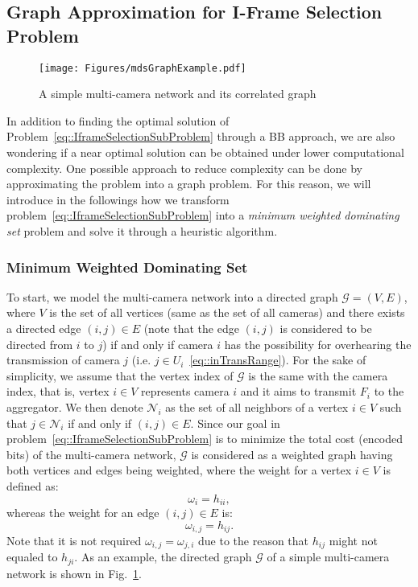 \subsection{Graph Approximation for I-Frame Selection Problem}
\label{sec::graphApprox}
%
\begin{figure}
\begin{center}
\texttt{[image: Figures/mdsGraphExample.pdf]}
\caption{\label{fig::mdsGraphExample}A simple multi-camera network and its correlated graph}
\end{center}
\end{figure}
%
In addition to finding the optimal solution of Problem~\eqref{eq::IframeSelectionSubProblem} through a BB approach, we are also wondering if a near optimal solution can be obtained under lower computational complexity.
One possible approach to reduce complexity can be done by approximating the problem into a graph problem.
For this reason, we will introduce in the followings how we transform problem~\eqref{eq::IframeSelectionSubProblem} into a \emph{minimum weighted dominating set} problem and solve it through a heuristic algorithm.
%
\subsubsection{Minimum Weighted Dominating Set}
To start, we model the multi-camera network into a directed graph $\mathcal{G}=(V,E)$, where $V$ is the set of all vertices (same as the set of all cameras) and there exists a directed edge $(i,j) \in E$ (note that the edge $(i,j)$ is considered to be directed from $i$ to $j$) if and only if camera $i$ has the possibility for overhearing the transmission of camera $j$ (i.e. $j \in U_i$~\eqref{eq::inTransRange}).
For the sake of simplicity, we assume that the vertex index of $\mathcal{G}$ is the same with the camera index, that is, vertex $i \in V$ represents camera $i$ and it aims to transmit $F_i$ to the aggregator.
We then denote $\mathcal{N}_i$ as the set of all neighbors of a vertex $i \in V$ such that $j \in \mathcal{N}_i$ if and only if $(i,j) \in E$.
Since our goal in problem~\eqref{eq::IframeSelectionSubProblem} is to minimize the total cost (encoded bits) of the multi-camera network, $\mathcal{G}$ is considered as a weighted graph having both vertices and edges being weighted, where the weight for a vertex $i \in V$ is defined as:
\begin{equation}
\omega_i = h_{ii},
\end{equation}
whereas the weight for an edge $(i,j) \in E$ is:
\begin{equation}
\omega_{i,j} = h_{ij}.
\end{equation}
Note that it is not required $\omega_{i,j} = \omega_{j,i}$ due to the reason that $h_{ij}$ might not equaled to $h_{ji}$.
As an example, the directed graph $\mathcal{G}$ of a simple multi-camera network is shown in Fig.~\ref{fig::mdsGraphExample}.
%

